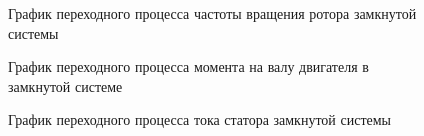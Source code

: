         \begin{figure}[h!]
            \caption{График переходного процесса частоты вращения ротора
                замкнутой системы}
            \label{fig:close-loop-wm}
        \end{figure}

        \begin{figure}[h!]
            \caption{График переходного процесса момента на валу двигателя в
                замкнутой системе}
            \label{fig:close-loop-te}
        \end{figure}

        \begin{figure}[h!]
            \caption{График переходного процесса тока статора 
                замкнутой системы}
            \label{fig:close-loop-is_a}
        \end{figure}

        \clearpage
